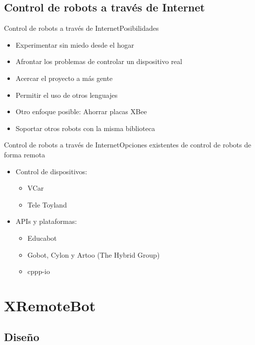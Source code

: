 \documentclass{beamer}
\begin{document}
\subsection{Control de robots a través de Internet}
\begin{frame}{Control de robots a través de Internet}{Posibilidades}
    \begin{itemize}[<+->]
        \item Experimentar sin miedo desde el hogar
        \item Afrontar los problemas de controlar un dispositivo real
        \item Acercar el proyecto a más gente
        \item Permitir el uso de otros lenguajes
        \item Otro enfoque posible: Ahorrar placas XBee
        \item Soportar otros robots con la misma biblioteca
    \end{itemize}
\end{frame}


\begin{frame}{Control de robots a través de Internet}{Opciones existentes de control de robots de forma remota}
    \begin{itemize}[<+->]
        \item Control de dispositivos:
        \begin{itemize}
            \item VCar
            \item Tele Toyland
        \end{itemize}
        \item APIs y plataformas:
        \begin{itemize}
            \item Educabot
            \item Gobot, Cylon y Artoo (The Hybrid Group)
            \item cppp-io
        \end{itemize}
    \end{itemize}
\end{frame}


\section{XRemoteBot}
\subsection{Diseño}
\end{document}
